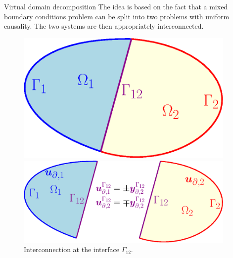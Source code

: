 \documentclass[aspectratio=169]{ISAE-Beamer}
\begin{document}
\begin{frame}{Virtual domain decomposition}
The idea is based on the fact that a mixed boundary conditions problem can be split into two problems with uniform causality. The two systems are then appropriately interconnected.

\begin{figure}[b]
	\begin{minipage}[b]{0.4\linewidth}
		\centering
		\includegraphics[width=0.95\textwidth]{part_3/pfem/dom_part.eps}
		\caption{Splitting of the domain.}
	\end{minipage}
	\hspace{0.5cm}
	\begin{minipage}[b]{0.55\linewidth}
		\centering
		\includegraphics[width=0.95\textwidth]{part_3/pfem/dom_part_int.eps}
		\caption{Interconnection at the interface $\Gamma_{12}$.}
	\end{minipage}
\end{figure}

\end{frame}
\end{document}
